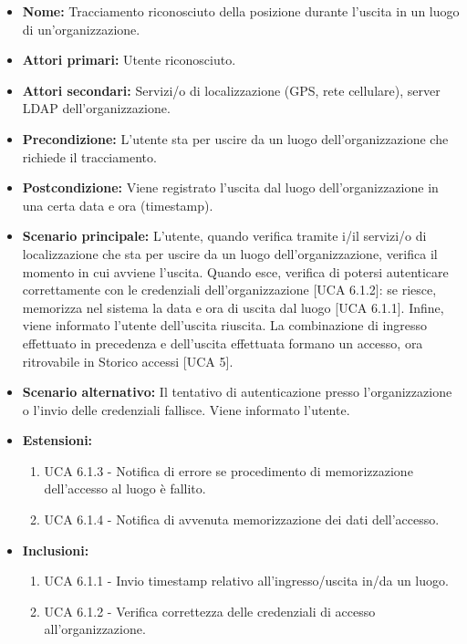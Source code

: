 \begin{itemize}
	\item \textbf{Nome:} Tracciamento riconosciuto della posizione durante l'uscita in un luogo di un'organizzazione.
	\item \textbf{Attori primari:} Utente riconosciuto.
	\item \textbf{Attori secondari:} Servizi/o di localizzazione (GPS, rete cellulare), server LDAP dell'organizzazione.
	\item \textbf{Precondizione:} L'utente sta per uscire da un luogo dell'organizzazione che richiede il tracciamento.
	\item \textbf{Postcondizione:} Viene registrato l'uscita dal luogo dell'organizzazione in una certa data e ora (timestamp).
	\item \textbf{Scenario principale:} L'utente, quando verifica tramite i/il servizi/o di localizzazione che sta per uscire da un luogo dell'organizzazione, verifica il momento in cui avviene l'uscita.
	Quando esce, verifica di potersi autenticare correttamente con le credenziali dell'organizzazione [UCA 6.1.2]: se riesce, memorizza nel sistema la data e ora di uscita dal luogo [UCA 6.1.1].
	Infine, viene informato l'utente dell'uscita riuscita. La combinazione di ingresso effettuato in precedenza e dell'uscita effettuata formano un accesso, ora ritrovabile in Storico accessi [UCA 5].
	\item \textbf{Scenario alternativo:} Il tentativo di autenticazione presso l'organizzazione o l'invio delle credenziali fallisce. Viene informato l'utente.
	\item \textbf{Estensioni:}
	\begin{enumerate}
		\item UCA 6.1.3 - Notifica di errore se procedimento di memorizzazione dell'accesso al luogo è fallito.
		\item UCA 6.1.4 - Notifica di avvenuta memorizzazione dei dati dell'accesso.
	\end{enumerate}
	\item \textbf{Inclusioni:}
	\begin{enumerate}
		\item UCA 6.1.1 - Invio timestamp relativo all'ingresso/uscita in/da un luogo.
		\item UCA 6.1.2 - Verifica correttezza delle credenziali di accesso all'organizzazione.
	\end{enumerate}
\end{itemize}

